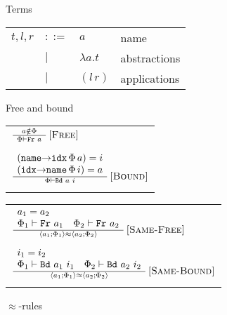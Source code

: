 \documentclass[a4paper,UKenglish]{lipics-v2016}
\makeatletter
\newenvironment*{premises}{\begin{array}{@{}l@{}}}{\end{array}}
\newcommand*{\infrule}[2]{\frac{\hspace{1ex}\vphantom{()}#1\hspace{1ex}}{\hspace{1ex}\vphantom{()}#2\hspace{1ex}}}
\newcommand*{\RNAME}[1]{\,\ensuremath{\textsc{[#1]}}}
\newcommand{\clos}[2] {
  \langle #1; #2 \rangle
}
\newcommand{\app}[2] {
  (#1\, #2)
}
\newcommand{\aeq}[4] {
  \clos{#1}{#2} \approx \clos{#3}{#4}
}
\makeatother
\begin{document}
\begin{wrapfigure}{r}{0.5\textwidth}
  \begin{minipage}[b]{0.4\textwidth}
   \caption{Terms\label{table:terms}}
  \begin{tabular}{r l l l}
    $t,l,r$ & $::=$ & $a$ & name \\
    & $|$ & $\lambda a.t$ & abstractions \\
    & $|$ & $\app{l}{r}$ & applications \\
    \end{tabular}
    \end{minipage}

\begin{minipage}[b]{0.4\textwidth}

  \caption{Free and bound\label{table:fb}}
  \begin{tabular}{l}
    $\infrule{%
    a \notin \Phi
    }{\Phi \vdash \texttt{Fr}\,\,a}
    \RNAME{Free}$  \\ \\


     $\infrule{%
    \begin{premises}
      (\texttt{name$\rightarrow$idx}\, \Phi\,a) = i \\
      (\texttt{idx$\rightarrow$name}\, \Phi\,i) = a 
  \end{premises}
    }{\Phi \vdash \texttt{Bd}\,\,a\,\,i}
    \RNAME{Bound}$  \\ \\


   \end{tabular}
\end{minipage}

\begin{minipage}[b]{0.4\textwidth}

  \caption{$\approx$-rules\label{table:same-name}}
  \begin{tabular}{l}
    $\infrule{%
    \begin{premises}
    a_1 = a_2 \\
    \Phi_1 \vdash \texttt{Fr}\,\, a_1 \quad
    \Phi_2 \vdash \texttt{Fr}\,\, a_2 
  \end{premises}
    }{\aeq{a_1}{\Phi_1}{a_2}{\Phi_2}}
    \RNAME{Same-Free}$  \\ \\

        $\infrule{%
    \begin{premises}
    i_1 = i_2 \\
      \Phi_1 \vdash \texttt{Bd}\,\, a_1\,\, i_1 \quad
    \Phi_2 \vdash \texttt{Bd}\,\, a_2\,\, i_2 
  \end{premises}
    }{\aeq{a_1}{\Phi_1}{a_2}{\Phi_2}}
    \RNAME{Same-Bound}$  \\ \\

 \end{tabular}
\end{minipage}


\end{wrapfigure}
\end{document}
